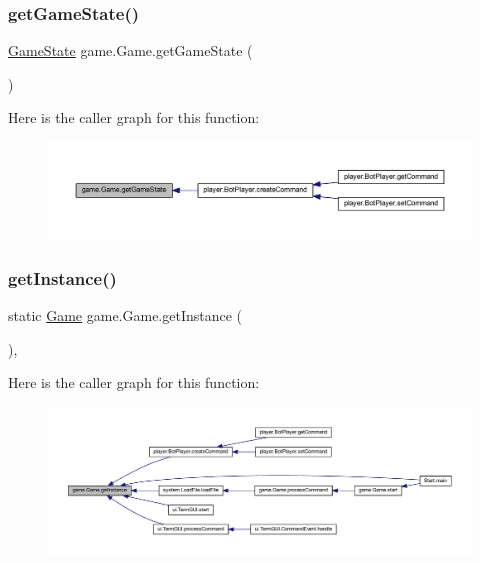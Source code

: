 \subsubsection{\texorpdfstring{get\+Game\+State()}{getGameState()}}
{\footnotesize\ttfamily \mbox{\hyperlink{classgame_1_1game_state_1_1_game_state}{Game\+State}} game.\+Game.\+get\+Game\+State (\begin{DoxyParamCaption}{ }\end{DoxyParamCaption})\hspace{0.3cm}{\ttfamily [inline]}}

Here is the caller graph for this function\+:
\nopagebreak
\begin{figure}[H]
\begin{center}
\leavevmode
\includegraphics[width=350pt]{classgame_1_1_game_a21ddf7c79b79b1fd7e433082107fdeaa_icgraph}
\end{center}
\end{figure}
\mbox{\label{classgame_1_1_game_a748613e7961431f1ab626475cf9c191b}} 
\subsubsection{\texorpdfstring{get\+Instance()}{getInstance()}}
{\footnotesize\ttfamily static \mbox{\hyperlink{classgame_1_1_game}{Game}} game.\+Game.\+get\+Instance (\begin{DoxyParamCaption}{ }\end{DoxyParamCaption})\hspace{0.3cm}{\ttfamily [inline]}, {\ttfamily [static]}}

Here is the caller graph for this function\+:
\nopagebreak
\begin{figure}[H]
\begin{center}
\leavevmode
\includegraphics[width=350pt]{classgame_1_1_game_a748613e7961431f1ab626475cf9c191b_icgraph}
\end{center}
\end{figure}
\mbox{\label{classgame_1_1_game_aef9aa5894fc276e5699e323156463e24}} 
